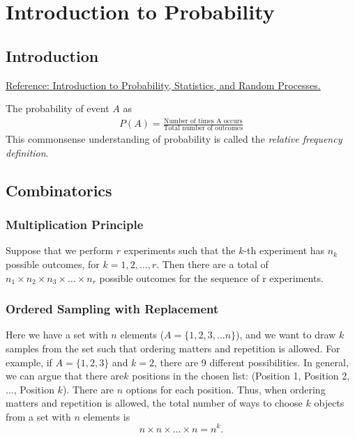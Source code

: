 \chapter{Introduction to Probability}
\section{Introduction}
\label{sec:intro_prob}

\href{https://www.probabilitycourse.com/chapter5/5_2_3_conditioning_independence.php}{Reference: Introduction to Probability, Statistics, and Random Processes.}


The probability of event $A$ as
\begin{align*}
	P(A) = \frac{\text{Number of times A occurs}}{\text{Total number of outcomes}}
\end{align*}
This commonsense understanding of probability is called the \textit{relative frequency definition}.


\section{Combinatorics}

\subsection{Multiplication Principle}
Suppose that we perform $r$ experiments such that the $k$-th experiment has $n_k$ possible outcomes, for $k=1,2,\dots,r$. Then there are a total of $n_1\times n_2\times n_3\times \dots \times n_r$ possible outcomes for the sequence of r experiments.

\subsection{Ordered Sampling with Replacement}
Here we have a set with $n$ elements (\eg $A=\{1,2,3,\dots n\}$), and we want to draw $k$ samples from the set such that ordering matters and repetition is allowed. For example, if $A=\{1,2,3\}$ and $k=2$, there are 9 different possibilities. In general, we can argue that there are$k$ 
positions in the chosen list: (Position 1, Position 2, $\dots$, Position $k$). There are $n$ options for each position. Thus, when ordering matters and repetition is allowed, the total number of ways to choose $k$ objects from a set with $n$ elements is
$$n\times n\times \dots \times n = n^k.$$

